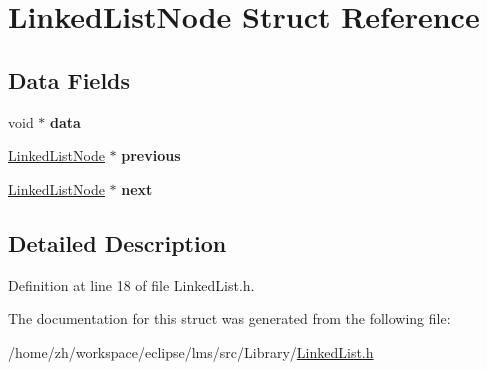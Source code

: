 \hypertarget{structLinkedListNode}{\section{Linked\-List\-Node Struct Reference}
\label{structLinkedListNode}
}
\subsection*{Data Fields}
\begin{DoxyCompactItemize}
\item 
\hypertarget{structLinkedListNode_a8762bd3731df051547b5fb5d307b1c7d}{void $\ast$ {\bfseries data}}\label{structLinkedListNode_a8762bd3731df051547b5fb5d307b1c7d}

\item 
\hypertarget{structLinkedListNode_ace142a5619cc50c1da57cdc9b9a1a958}{\hyperlink{structLinkedListNode}{Linked\-List\-Node} $\ast$ {\bfseries previous}}\label{structLinkedListNode_ace142a5619cc50c1da57cdc9b9a1a958}

\item 
\hypertarget{structLinkedListNode_a374de7efcac1a41f282640faeea01553}{\hyperlink{structLinkedListNode}{Linked\-List\-Node} $\ast$ {\bfseries next}}\label{structLinkedListNode_a374de7efcac1a41f282640faeea01553}

\end{DoxyCompactItemize}


\subsection{Detailed Description}


Definition at line 18 of file Linked\-List.\-h.



The documentation for this struct was generated from the following file\-:\begin{DoxyCompactItemize}
\item 
/home/zh/workspace/eclipse/lms/src/\-Library/\hyperlink{LinkedList_8h}{Linked\-List.\-h}\end{DoxyCompactItemize}
